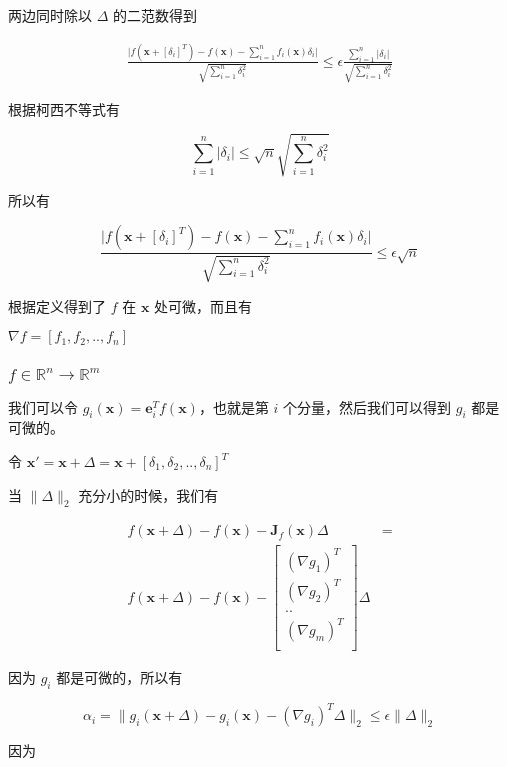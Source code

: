 \documentclass[12pt,a4paper]{ctexart}
\begin{document}
两边同时除以 $\Delta$ 的二范数得到 


\begin{align*}
    \frac{\lvert f(\mathbf{x} + [\delta_i]^T)  - f(\mathbf{x}) - \sum_{i=1}^{n}f_i(\mathbf{x})\delta_i \rvert}{\sqrt{\sum_{i=1}^{n}\delta_i^2}}   \le \epsilon \frac{\sum_{i=1}^{n} \lvert \delta_i \rvert}{\sqrt{\sum_{i=1}^{n}\delta_i^2}}
\end{align*}

根据柯西不等式有

\[
\sum_{i=1}^{n} \lvert \delta_i \rvert \le \sqrt{n} \sqrt{\sum_{i=1}^{n}\delta_i^2}
\]

所以有

\[
\frac{\lvert f(\mathbf{x} + [\delta_i]^T)  - f(\mathbf{x}) - \sum_{i=1}^{n}f_i(\mathbf{x})\delta_i \rvert}{\sqrt{\sum_{i=1}^{n}\delta_i^2}} \le \epsilon \sqrt{n}
\]

根据定义得到了 $f$ 在 $\mathbf{x}$ 处可微，而且有

$\nabla f = [f_1, f_2, .. , f_n]$

\subsubsection{$f \in \mathbb{R}^n \to \mathbb{R}^m$ }

我们可以令 $g_i(\mathbf{x}) = \mathbf{e}_i^T f(\mathbf{x})$，也就是第 $i$ 个分量，然后我们可以得到 $g_i$ 都是可微的。

令 $\mathbf{x'} = \mathbf{x} + \Delta = \mathbf{x} + [\delta_1, \delta_2, .., \delta_n]^T$

当 $\| \Delta \|_2$ 充分小的时候，我们有

\begin{align*}
f(\mathbf{x} + \Delta) - f(\mathbf{x}) - \mathbf{J}_f(\mathbf{x}) \Delta &= \\
f(\mathbf{x} + \Delta) - f(\mathbf{x}) - \begin{bmatrix}
    (\nabla g_1)^T \\
    (\nabla g_2)^T \\
    .. \\
    (\nabla g_m)^T \\
\end{bmatrix}  \Delta
\end{align*}

因为 $g_i$ 都是可微的，所以有

\[
\alpha_i = \| g_i(\mathbf{x} + \Delta) - g_i(\mathbf{x}) - (\nabla g_i)^T\Delta \|_2 \le \epsilon \| \Delta \|_2
\]

因为
\end{document}

